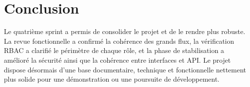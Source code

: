 \section{Conclusion}
Le quatrième sprint a permis de consolider le projet et de le rendre plus robuste. La revue fonctionnelle a confirmé la cohérence des grands flux, la vérification RBAC a clarifié le périmètre de chaque rôle, et la phase de stabilisation a amélioré la sécurité ainsi que la cohérence entre interfaces et API. Le projet dispose désormais d'une base documentaire, technique et fonctionnelle nettement plus solide pour une démonstration ou une poursuite de développement.
